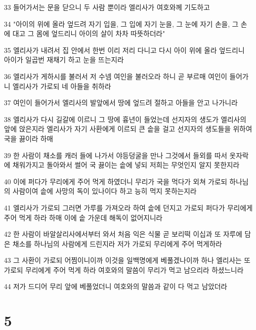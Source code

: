 \par 33 들어가서는 문을 닫으니 두 사람 뿐이라 엘리사가 여호와께 기도하고
\par 34 "아이의 위에 올라 엎드려 자기 입을, 그 입에 자기 눈을, 그 눈에 자기 손을, 그 손에 대고 그 몸에 엎드리니 아이의 살이 차차 따뜻하더라"
\par 35 엘리사가 내려서 집 안에서 한번 이리 저리 다니고 다시 아이 위에 올라 엎드리니 아이가 일곱번 재채기 하고 눈을 뜨는지라
\par 36 엘리사가 게하시를 불러서 저 수넴 여인을 불러오라 하니 곧 부르매 여인이 들어가니 엘리사가 가로되 네 아들을 취하라
\par 37 여인이 들어가서 엘리사의 발앞에서 땅에 엎드려 절하고 아들을 안고 나가니라
\par 38 엘리사가 다시 길갈에 이르니 그 땅에 흉년이 들었는데 선지자의 생도가 엘리사의 앞에 앉은지라 엘리사가 자기 사환에게 이르되 큰 솥을 걸고 선지자의 생도들을 위하여 국을 끓이라 하매
\par 39 한 사람이 채소를 캐러 들에 나가서 야등덩굴을 만나 그것에서 들외를 따서 옷자락에 채워가지고 돌아와서 썰어 국 끓이는 솥에 넣되 저희는 무엇인지 알지 못한지라
\par 40 이에 퍼다가 무리에게 주어 먹게 하였더니 무리가 국을 먹다가 외쳐 가로되 하나님의 사람이여 솥에 사망의 독이 있나이다 하고 능히 먹지 못하는지라
\par 41 엘리사가 가로되 그러면 가루를 가져오라 하여 솥에 던지고 가로되 퍼다가 무리에게 주어 먹게 하라 하매 이에 솥 가운데 해독이 없어지니라
\par 42 한 사람이 바알살리사에서부터 와서 처음 익은 식물 곧 보리떡 이십과 또 자루에 담은 채소를 하나님의 사람에게 드린지라 저가 가로되 무리에게 주어 먹게하라
\par 43 그 사환이 가로되 어찜이니이까 이것을 일백명에게 베풀겠나이까 하나 엘리사는 또 가로되 무리에게 주어 먹게 하라 여호와의 말씀이 무리가 먹고 남으리라 하셨느니라
\par 44 저가 드디어 무리 앞에 베풀었더니 여호와의 말씀과 같이 다 먹고 남았더라

\chapter{5}

